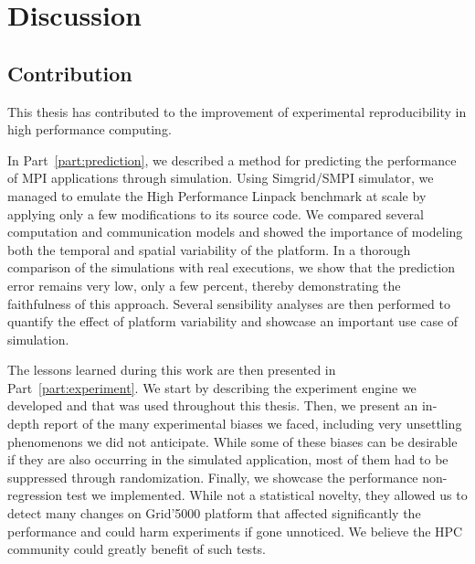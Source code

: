 \chapter{Discussion}
\label{chapter:conclusion}


    \section{Contribution}%

        This thesis has contributed to the improvement of experimental reproducibility in high performance computing.

        In Part~\ref{part:prediction}, we described a method for predicting the performance of MPI applications through
        simulation. Using Simgrid/SMPI simulator, we managed to emulate the High Performance Linpack benchmark at scale
        by applying only a few modifications to its source code. We compared several computation and communication
        models and showed the importance of modeling both the temporal and spatial variability of the platform. In a
        thorough comparison of the simulations with real executions, we show that the prediction error remains very low,
        only a few percent, thereby demonstrating the faithfulness of this approach. Several sensibility analyses are
        then performed to quantify the effect of platform variability and showcase an important use case of simulation.

        The lessons learned during this work are then presented in Part~\ref{part:experiment}. We start by describing the
        experiment engine we developed and that was used throughout this thesis. Then, we present an in-depth report of
        the many experimental biases we faced, including very unsettling phenomenons we did not anticipate. While some
        of these biases can be desirable if they are also occurring in the simulated application, most of them had to be
        suppressed through randomization. Finally, we showcase the performance non-regression test we implemented. While
        not a statistical novelty, they allowed us to detect many changes on Grid'5000 platform that affected
        significantly the performance and could harm experiments if gone unnoticed. We believe the HPC community could
        greatly benefit of such tests.

